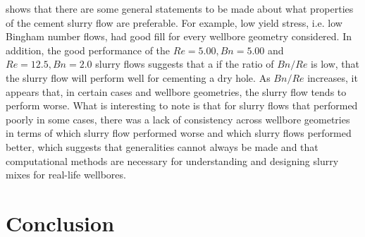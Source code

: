 \documentclass[pdftex,ms]{pittetd}
\begin{document}
 shows that there are some general statements to be made about what properties of the cement slurry flow are preferable.
For example, low yield stress, i.e. low Bingham number flows, had good fill for every wellbore geometry considered.
In addition, the good performance of the $Re = 5.00, Bn = 5.00$ and $Re = 12.5, Bn = 2.0$ slurry flows suggests that a if the ratio of $Bn / Re$ is low, that the slurry flow will perform well for cementing a dry hole.
As $Bn / Re$ increases, it appears that, in certain cases and wellbore geometries, the slurry flow tends to perform worse.
What is interesting to note is that for slurry flows that performed poorly in some cases, there was a lack of consistency across wellbore geometries in terms of which slurry flow performed worse and which slurry flows performed better, which suggests that generalities cannot always be made and that computational methods are necessary for understanding and designing slurry mixes for real-life wellbores.

\section{Conclusion} \label{sec:conclusion}
\end{document}
